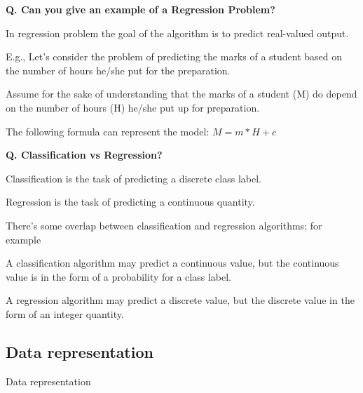 \begin{frame}[fragile]{\textbf{Q. Can you give an example of a Regression Problem?}}
  \begin{wideitemize}
    \item In regression problem the goal of the algorithm is to predict real-valued output.
    \item E.g., Let’s consider the problem of predicting the marks of a student based on the number of hours he/she
    put for the preparation.
    \begin{wideitemize}
      \item Assume for the sake of understanding that the marks of a student (M) do depend on the number of hours (H) he/she put up for preparation.
      \item The following formula can represent the model: $M = m*H + c$
    \end{wideitemize}
  \end{wideitemize}
\end{frame}

\begin{frame}[fragile]{\textbf{Q. Classification vs Regression?}}
  \begin{wideitemize}
    \item Classification is the task of predicting a discrete class label.
    \item Regression is the task of predicting a continuous quantity.
    \item There's some overlap between classification and regression algorithms; for example
    \begin{wideitemize}
      \item A classification algorithm may predict a continuous value, but the continuous value is in the form of a probability for a class label.
      \item A regression algorithm may predict a discrete value, but the discrete value in the form of an integer quantity.
    \end{wideitemize}
  \end{wideitemize}
\end{frame}


\subsection{Data representation}
\begin{transitionsubframe}
  \begin{center}
    \Huge Data representation
  \end{center}
\end{transitionsubframe}

